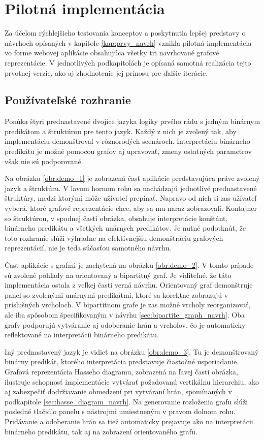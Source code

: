 \chapter{Pilotná implementácia}
\label{kap:pilot} %

Za účelom rýchlejšieho testovania konceptov a poskytnutia lepšej predstavy o návrhoch opísaných v kapitole \ref{kap:prvy_navrh} vznikla pilotná implementácia vo forme webovej aplikácie obsahujúca všetky tri navrhované grafové reprezentácie. V jednotlivých podkapitolách je opísaná samotná realizácia tejto prvotnej verzie, ako aj zhodnotenie jej prínosu pre ďalšie iterácie.

\section{Používateľské rozhranie}
\label{sec:pilot_desc}

Ponúka štyri prednastavené dvojice jazyka logiky prvého rádu s jedným binárnym predikátom a štruktúrou pre tento jazyk. Každý z nich je zvolený tak, aby implementáciu demonštroval v rôznorodých scenároch. Interpretáciu binárneho predikátu je možné pomocou grafov aj upravovať, zmeny ostatných parametrov však nie sú podporované.

Na obrázku \ref{obr:demo_1} je zobrazená časť aplikácie predstavujúca práve zvolený jazyk a štruktúru. V ľavom hornom rohu sa nachádzajú jednotlivé prednastavené štruktúry, medzi ktorými môže užívateľ prepínať. Napravo od nich si zas užívateľ vyberá, ktoré grafové reprezentácie chce, aby sa mu naraz zobrazovali. Kontajner so štruktúrou, v spodnej častí obrázka,  obsahuje interpretácie konštánt, binárneho predikátu a všetkých unárnych predikátov. Je nutné podotknúť, že toto rozhranie slúži výhradne na efektívnejšiu demonštráciu grafových reprezentácií, nie je teda súčasťou samotného návrhu.

Časť aplikácie s grafmi je zachytená na obrázku \ref{obr:demo_2}. V tomto prípade sú zvolené pohľady na orientovaný a bipartitný graf. Je viditeľné, že táto implementácia ostala z veľkej časti verná návrhu. Orientovaný graf demonštruje panel so zvolenými unárnymi predikátmi, ktoré sa korektne zobrazujú v príslušných vrcholoch. V bipartitnom grafe je zas možné vrcholy reorganizovať, ale iba spôsobom špecifikovaným v návrhu \ref{sec:bipartite_graph_navrh}. Oba grafy podporujú vytváranie aj odoberanie hrán a vrcholov, čo je automaticky reflektované na interpretácii binárneho predikátu.

Iný prednastavený jazyk je vidieť na obrázku \ref{obr:demo_3}. Tu je demonštrovaný binárny predikát, ktorého interpretácia predstavuje čiastočné usporiadanie. Grafová reprezentácia Hasseho diagramu, zobrazená na ľavej časti obrázka, ilustruje schopnosť implementácie vytvárať požadovanú vertikálnu hierarchiu, ako aj zabezpečiť dodržiavanie obmedzení pri vytváraní hrán, spomínaných v podkapitole \ref{sec:hasse_diagram_navrh}. Na generovanie rozloženia grafu slúži posledné tlačidlo panelu s nástrojmi umiestneným v pravom dolnom rohu. Pridávanie a odoberanie hrán sa tiež automaticky prejavuje ako na interpretácii binárneho predikátu, tak aj na zobrazení orientovaného grafu.

